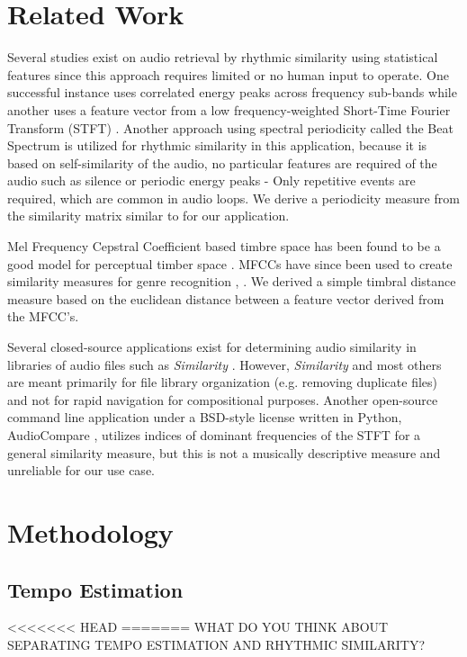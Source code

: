 \documentclass{article}
\begin{document}
\section{Related Work}

Several studies exist on audio retrieval by rhythmic similarity using statistical features since this approach requires limited or no human input to operate. One successful instance uses correlated energy peaks across frequency sub-bands \cite{scheirer1998tempo}  while another uses a feature vector from a low frequency-weighted Short-Time Fourier Transform (STFT) \cite{wold1999classification}. Another approach using spectral periodicity called the Beat Spectrum \cite{foote2001beat} is utilized for rhythmic similarity in this application, because it is based on self-similarity of the audio, no particular features are required of the audio such as silence or periodic energy peaks - Only repetitive events are required, which are common in audio loops. We derive a periodicity measure from the similarity matrix similar to \cite{foote2001beat} for our application.

Mel Frequency Cepstral Coefficient based timbre space has been found to be a good model for perceptual timber space \cite{terasawa2005thirteen}. MFCCs have since been used to create similarity measures \cite{jensen2009quantitative} for genre recognition \cite{levy2006lightweight}, \cite{jensen2006evaluation}. We derived a simple timbral distance measure based on the euclidean distance between a feature vector derived from the MFCC's.

Several closed-source applications exist for determining audio similarity in libraries of audio files such as \textit{Similarity} \cite{similarityapp}. However, \textit{Similarity} and most others are meant primarily for file library organization (e.g. removing duplicate files) and not for rapid navigation for compositional purposes. Another open-source command line application under a BSD-style license written in Python, AudioCompare \cite{audiocompare}, utilizes indices of dominant frequencies of the STFT for a general similarity measure, but this is not a musically descriptive measure and unreliable for our use case. 


\section{Methodology}

\subsection{Tempo Estimation}
<<<<<<< HEAD
=======
WHAT DO YOU THINK ABOUT SEPARATING TEMPO ESTIMATION AND RHYTHMIC SIMILARITY?
\end{document}
